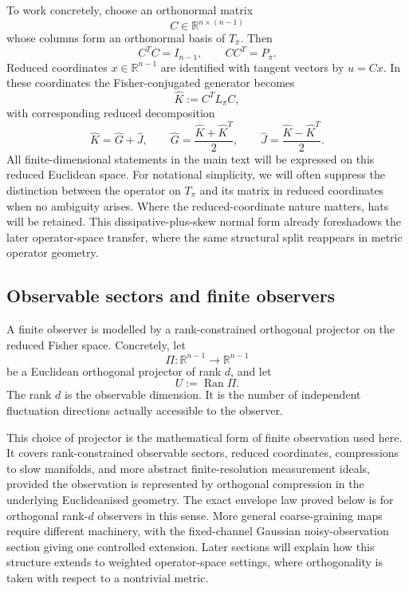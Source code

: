 \documentclass[11pt,a4paper]{article}
\numberwithin{equation}{section}
\theoremstyle{thmcompact}
\theoremstyle{remark}
\begin{document}
To work concretely, choose an orthonormal matrix
\begin{equation}
C\in\mathbb R^{n\times (n-1)}
\end{equation}
whose columns form an orthonormal basis of \(T_\pi\). Then
\begin{equation}
C^T C=I_{n-1},
\qquad
CC^T=P_\pi.
\end{equation}
Reduced coordinates \(x\in\mathbb R^{n-1}\) are identified with tangent vectors by \(u=Cx\). In these coordinates the Fisher-conjugated generator becomes
\begin{equation}
\widehat K:=C^T L_\pi C,
\end{equation}
with corresponding reduced decomposition
\begin{equation}
\widehat K=\widehat G+\widehat J,
\qquad
\widehat G=\frac{\widehat K+\widehat K^T}{2},
\qquad
\widehat J=\frac{\widehat K-\widehat K^T}{2}.
\end{equation}
All finite-dimensional statements in the main text will be expressed on this reduced Euclidean space. For notational simplicity, we will often suppress the distinction between the operator on \(T_\pi\) and its matrix in reduced coordinates when no ambiguity arises. Where the reduced-coordinate nature matters, hats will be retained. This dissipative-plus-skew normal form already foreshadows the later operator-space transfer, where the same structural split reappears in metric operator geometry.

\subsection{Observable sectors and finite observers}

A finite observer is modelled by a rank-constrained orthogonal projector on the reduced Fisher space. Concretely, let
\begin{equation}
\Pi:\mathbb R^{n-1}\to\mathbb R^{n-1}
\end{equation}
be a Euclidean orthogonal projector of rank \(d\), and let
\begin{equation}
U:=\operatorname{Ran}\Pi.
\end{equation}
The rank \(d\) is the observable dimension. It is the number of independent fluctuation directions actually accessible to the observer.

This choice of projector is the mathematical form of finite observation used here. It covers rank-constrained observable sectors, reduced coordinates, compressions to slow manifolds, and more abstract finite-resolution measurement ideals, provided the observation is represented by orthogonal compression in the underlying Euclideanised geometry. The exact envelope law proved below is for orthogonal rank-\(d\) observers in this sense. More general coarse-graining maps require different machinery, with the fixed-channel Gaussian noisy-observation section giving one controlled extension. Later sections will explain how this structure extends to weighted operator-space settings, where orthogonality is taken with respect to a nontrivial metric.
\end{document}
